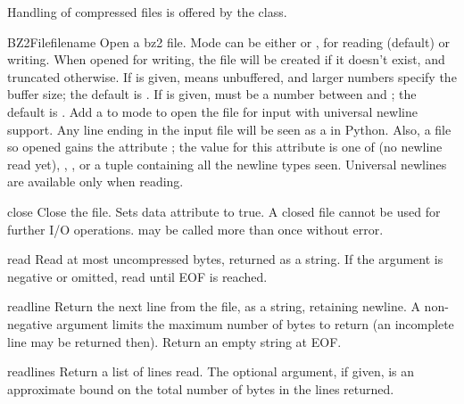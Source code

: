 Handling of compressed files is offered by the  class.

\begin{classdesc}{BZ2File}{filename}
Open a bz2 file. Mode can be either  or , for reading 
(default) or writing. When opened for writing, the file will be created if
it doesn't exist, and truncated otherwise. If  is given,
 means unbuffered, and larger numbers specify the buffer size;
the default is . If
 is given, must be a number between  and
; the default is .
Add a  to mode to open the file for input with universal newline
support. Any line ending in the input file will be seen as a
in Python.  Also, a file so opened gains the attribute ;
the value for this attribute is one of  (no newline read yet),
, ,
 or a tuple containing all the
newline types seen. Universal newlines are available only when reading.
\end{classdesc}

\begin{methoddesc}[BZ2File]{close}{}
Close the file. Sets data attribute  to true. A closed file
cannot be used for further I/O operations.  may be called
more than once without error.
\end{methoddesc}

\begin{methoddesc}[BZ2File]{read}{}
Read at most  uncompressed bytes, returned as a string. If the
 argument is negative or omitted, read until EOF is reached.
\end{methoddesc}

\begin{methoddesc}[BZ2File]{readline}{}
Return the next line from the file, as a string, retaining newline.
A non-negative  argument limits the maximum number of bytes to
return (an incomplete line may be returned then). Return an empty
string at EOF.
\end{methoddesc}

\begin{methoddesc}[BZ2File]{readlines}{}
Return a list of lines read. The optional  argument, if given,
is an approximate bound on the total number of bytes in the lines returned.
\end{methoddesc}

